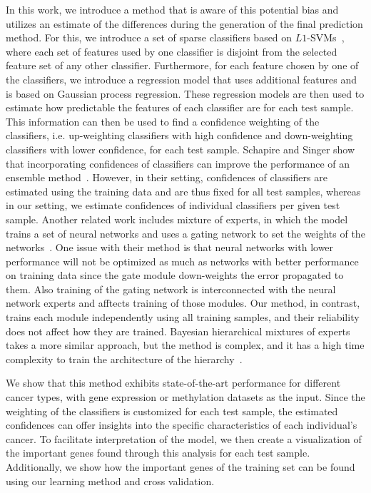 In this work, we introduce a method that is aware of this potential bias and utilizes an estimate of the differences during the generation of the final prediction method. For this, we introduce a set of sparse classifiers based on $L1$-SVMs~\cite{bradley1998feature}, where each set of features used by one classifier is disjoint from the selected feature set of any other classifier. Furthermore, for each feature chosen by one of the classifiers, we introduce a regression model that uses additional features and is based on Gaussian process regression. These regression models are then used to estimate how predictable the features of each classifier are for each test sample. This information can then be used to find a confidence weighting of the classifiers, i.e. up-weighting classifiers with high confidence and down-weighting classifiers with lower confidence, for each test sample. Schapire and Singer show that incorporating confidences of classifiers can improve the performance of an ensemble method~\cite{adaboost99improved}. However, in their setting, confidences of classifiers are estimated using the training data and are thus fixed for all test samples, whereas in our setting, we estimate confidences of individual classifiers per given test sample. Another related work includes mixture of experts, in which the model trains a set of neural networks and uses a gating network to set the weights of the networks~\cite{jacobs1991adaptive}. One issue with their method is that neural networks with lower performance will not be optimized as much as networks with better performance on training data since the gate module down-weights the error propagated to them. Also training of the gating network is interconnected with the neural network experts and afftects training of those modules. Our method, in contrast, trains each module independently using all training samples, and their reliability does not affect how they are trained. Bayesian hierarchical mixtures of experts takes a more similar approach, but the method is complex, and it has a high time complexity to train the architecture of the hierarchy~\cite{bishop2002bayesian}.

We show that this method exhibits state-of-the-art performance for different cancer types, with gene expression or methylation datasets as the input. Since the weighting of the classifiers is customized for each test sample, the estimated confidences can offer insights into the specific characteristics of each individual's cancer. To facilitate interpretation of the model, we then create a visualization of the important genes found through this analysis for each test sample. Additionally, we show how the important genes of the training set can be found using our learning method and cross validation.

